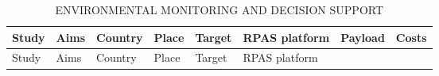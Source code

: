 \documentclass[]{interact}
\theoremstyle{plain}%
\theoremstyle{definition}
\theoremstyle{remark}
\begin{document}
\begin{longtable}[]{@{}llllllll@{}}
\caption{ENVIRONMENTAL MONITORING AND DECISION SUPPORT}\tabularnewline
\toprule
\begin{minipage}[b]{0.11\columnwidth}\raggedright\strut
Study\strut
\end{minipage} & \begin{minipage}[b]{0.18\columnwidth}\raggedright\strut
Aims\strut
\end{minipage} & \begin{minipage}[b]{0.03\columnwidth}\raggedright\strut
Country\strut
\end{minipage} & \begin{minipage}[b]{0.14\columnwidth}\raggedright\strut
Place\strut
\end{minipage} & \begin{minipage}[b]{0.10\columnwidth}\raggedright\strut
Target\strut
\end{minipage} & \begin{minipage}[b]{0.09\columnwidth}\raggedright\strut
RPAS platform\strut
\end{minipage} & \begin{minipage}[b]{0.11\columnwidth}\raggedright\strut
Payload\strut
\end{minipage} & \begin{minipage}[b]{0.01\columnwidth}\raggedright\strut
Costs\strut
\end{minipage}\tabularnewline
\midrule
\endfirsthead
\toprule
\begin{minipage}[b]{0.11\columnwidth}\raggedright\strut
Study\strut
\end{minipage} & \begin{minipage}[b]{0.18\columnwidth}\raggedright\strut
Aims\strut
\end{minipage} & \begin{minipage}[b]{0.03\columnwidth}\raggedright\strut
Country\strut
\end{minipage} & \begin{minipage}[b]{0.14\columnwidth}\raggedright\strut
Place\strut
\end{minipage} & \begin{minipage}[b]{0.10\columnwidth}\raggedright\strut
Target\strut
\end{minipage} & \begin{minipage}[b]{0.09\columnwidth}\raggedright\strut
RPAS platform\strut
\end{minipage} & \begin{minipage}[b]{0.11\columnwidth}\raggedright\strut

\end{minipage}
\end{longtable}
\end{document}

